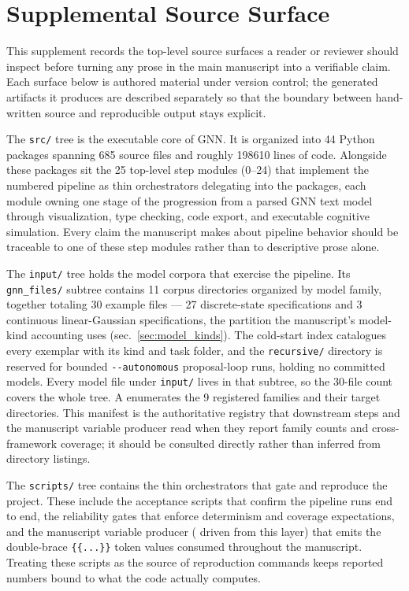 \documentclass[
  english,
  9pt,
]{extarticle}
\begin{document}
\newpage

\section{Supplemental Source Surface}\label{sec:source_surface}

This supplement records the top-level source surfaces a reader or
reviewer should inspect before turning any prose in the main manuscript
into a verifiable claim. Each surface below is authored material under
version control; the generated artifacts it produces are described
separately so that the boundary between hand-written source and
reproducible output stays explicit.

The \texttt{src/} tree is the executable core of GNN. It is organized
into 44 Python packages spanning 685 source files and roughly 198610
lines of code. Alongside these packages sit the 25 top-level step
modules (0--24) that implement the numbered pipeline as thin
orchestrators delegating into the packages, each module owning one stage
of the progression from a parsed GNN text model through visualization,
type checking, code export, and executable cognitive simulation. Every
claim the manuscript makes about pipeline behavior should be traceable
to one of these step modules rather than to descriptive prose alone.

The \texttt{input/} tree holds the model corpora that exercise the
pipeline. Its \texttt{gnn\_files/} subtree contains 11 corpus
directories organized by model family, together totaling 30 example
files --- 27 discrete-state specifications and 3 continuous
linear-Gaussian specifications, the partition the manuscript's
model-kind accounting uses (sec.~\ref{sec:model_kinds}). The cold-start
index  catalogues every exemplar with
its kind and task folder, and the \texttt{recursive/} directory is
reserved for bounded \texttt{-\/-autonomous} proposal-loop runs, holding
no committed models. Every model file under \texttt{input/} lives in
that subtree, so the 30-file count covers the whole tree. A
 enumerates the 9 registered
families and their target directories. This manifest is the
authoritative registry that downstream steps and the manuscript variable
producer read when they report family counts and cross-framework
coverage; it should be consulted directly rather than inferred from
directory listings.

The \texttt{scripts/} tree contains the thin orchestrators that gate and
reproduce the project. These include the acceptance scripts that confirm
the pipeline runs end to end, the reliability gates that enforce
determinism and coverage expectations, and the manuscript variable
producer ( driven from this
layer) that emits the double-brace \texttt{\{\{...\}\}} token values
consumed throughout the manuscript. Treating these scripts as the source
of reproduction commands keeps reported numbers bound to what the code
actually computes.
\end{document}
